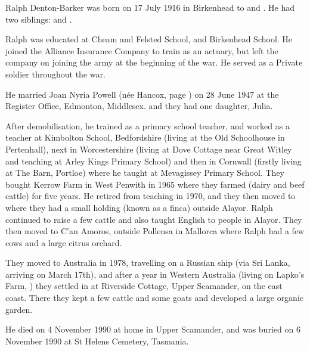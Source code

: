 
Ralph Denton-Barker was born on 17 July 1916 in Birkenhead to  and
. He had two siblings:  and \cite{BMDIndex_RalphMundayDentonBarker_birth}.

Ralph was educated at Cheam and Felsted School, and Birkenhead School. He joined the Alliance Insurance Company to train as an actuary, but left the company on joining the army at the beginning of the war. He served as a Private soldier throughout the war. 

He married Joan Nyria Powell (n\'{e}e Hancox, page \pageref{Joan_Nyria_Hancox}) on 28 June 1947 at the Register Office, Edmonton, Middlesex.\cite{MarriageCertRalphDentonBarkerJoanNyriaPowell} and they had one daughter, Julia.

After demobilisation, he trained as a primary school teacher, and worked as a teacher at Kimbolton School,  Bedfordshire (living at the Old Schoolhouse in Pertenhall), next in  Worcestershire (living at Dove Cottage near Great Witley and teaching at Arley Kings Primary School) and then in Cornwall (firstly living at The Barn, Portloe) where he taught at Mevagissey Primary School.  They  bought Kerrow Farm in West Penwith in 1965 where they farmed (dairy and beef cattle) for five years. 
He retired from teaching in 1970, and they then moved to  where they had a small holding (known as a finca) outside Alayor. Ralph continued to raise a few cattle and also taught English to people in Alayor.  They then moved to C'an Amoros, outside Pollensa in Mallorca where Ralph had a few cows and a large citrus orchard.

They moved to Australia in 1978, travelling on a Russian ship (via Sri Lanka, arriving on March 17th), and after a year in Western Australia (living on Lapko's Farm, ) they settled in  at Riverside Cottage, Upper Scamander, on the east coast. There they kept a few cattle and some goats and developed a large organic garden.

He died on 4 November 1990\cite{RMDBarkerDeath, RalphDeathCert} at home in Upper Scamander, and was buried on 6 November 1990 at St Helens Cemetery, Tasmania.

